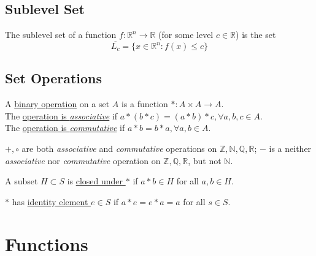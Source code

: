 \documentclass[11pt]{elegantbook}
\begin{document}
\subsection{Sublevel Set}
\begin{definition}
    The sublevel set of a function $f: \mathbb{R}^n \rightarrow \mathbb{R}$ (for some level $c\in \mathbb{R}$) is the set $$\overline{L_c}=\{x\in \mathbb{R}^n:f(x)\leq c\}$$
\end{definition}



\subsection{Set Operations}
\begin{definition}
    A \underline{binary operation} on a set $A$ is a function $*:A\times A \rightarrow A$.\\
    The \underline{operation is \textit{associative}} if $a*(b*c)=(a*b)*c, \forall a,b,c\in A$.\\
    The \underline{operation is \textit{commutative}} if $a*b=b*a, \forall a,b\in A$.
\end{definition}

\begin{example}

${+,\circ}$ are both \textit{associative} and \textit{commutative} operations on $\mathbb{Z},\mathbb{N},\mathbb{Q},\mathbb{R}$; $-$ is a neither \textit{associative} nor \textit{commutative} operation on $\mathbb{Z},\mathbb{Q},\mathbb{R}$, but not $\mathbb{N}$.
\end{example}

\begin{definition}
A subset $H\subset S$ is \underline{closed under $*$} if $a*b\in H$ for all $a,b\in H$.
\end{definition}

\begin{definition}
$*$ has \underline{identity element $e\in S$} if $a*e=e*a=a$ for all $s\in S$.
\end{definition}






\section{Functions}
\end{document}
